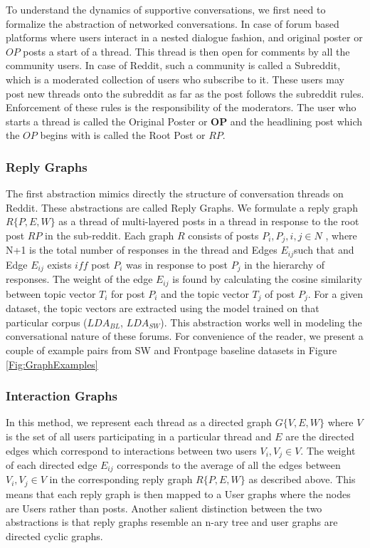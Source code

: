 \label{Sec:Conversations}
To understand the dynamics of supportive conversations, we first need to formalize the abstraction of networked conversations. In case of forum based platforms where users interact in a nested dialogue fashion, and original poster or $OP$ posts a start of a thread. This thread is then open for comments by all the community users. In case of Reddit, such a community is called a Subreddit, which is a moderated collection of users who subscribe to it. These users may post new threads onto the subreddit as far as the post follows the subreddit rules. Enforcement of these rules is the responsibility of the moderators. The user who starts a thread is called the Original Poster or \textbf{OP} and the headlining post which the $OP$ begins with is called the Root Post or $RP$. 

\subsubsection{Reply Graphs}
\label{Sec:Reply_graphs}
The first abstraction mimics directly the structure of conversation threads on Reddit. These abstractions are called Reply Graphs. We formulate a reply graph $R\{P,E,W\}$ as a thread of multi-layered posts in a thread in response to the root post $RP$ in the sub-reddit. Each graph $R$ consists of posts $P_i , P_j , i,j \in N$ , where N+1 is the total number of responses in the thread and Edges $E_{ij}$such that and Edge $E_{ij}$ exists $iff$ post $P_i$ was in response to post $P_j$ in the hierarchy of responses.  The weight of the edge $E_{ij}$ is found by calculating the cosine similarity between topic vector $T_i$ for post $P_i$ and the topic vector $T_j$ of post $P_j$. For a given dataset, the topic vectors are extracted using the model trained on that particular corpus ($LDA_{BL}$, $LDA_{SW}$).  This abstraction works well in modeling the conversational nature of these forums.  For convenience of the reader, we present a couple of example pairs from SW and Frontpage baseline datasets in Figure \ref{Fig:GraphExamples}


\subsubsection{Interaction Graphs}
\label{Sec:Interaction_graphs}
In this method, we represent each thread as a directed graph $G\{V,E,W\}$ where $V$ is the set of all users participating in a particular thread and $E$ are the directed  edges which correspond to interactions between two users $V_i , V_j  \in V$. The weight of each directed edge $E_{ij}$ corresponds to the average of all the edges between $V_i , V_j  \in V$ in the corresponding reply graph $R\{P,E,W\}$ as described above. This means that each reply graph is then mapped to a User graphs where the nodes are Users rather than posts. Another salient distinction between the two abstractions is that reply graphs resemble an n-ary tree and user graphs are directed cyclic graphs. 



